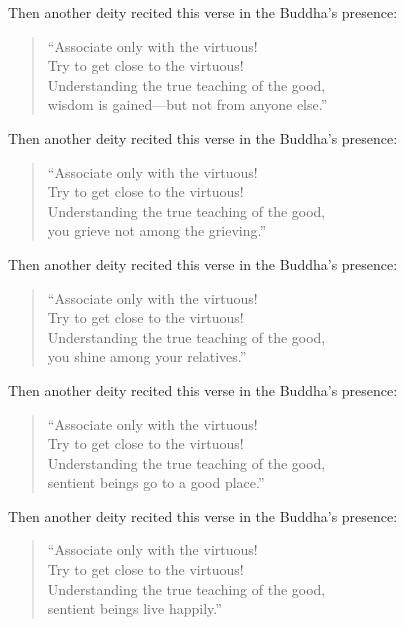 \documentclass[12pt,openany]{book}%
\begin{document}
Then another deity recited this verse in the Buddha’s presence: 

\begin{verse}%
“Associate only with the virtuous! \\
Try to get close to the virtuous! \\
Understanding the true teaching of the good, \\
wisdom is gained—but not from anyone else.” 

%
\end{verse}

Then another deity recited this verse in the Buddha’s presence: 

\begin{verse}%
“Associate only with the virtuous! \\
Try to get close to the virtuous! \\
Understanding the true teaching of the good, \\
you grieve not among the grieving.” 

%
\end{verse}

Then another deity recited this verse in the Buddha’s presence: 

\begin{verse}%
“Associate only with the virtuous! \\
Try to get close to the virtuous! \\
Understanding the true teaching of the good, \\
you shine among your relatives.” 

%
\end{verse}

Then another deity recited this verse in the Buddha’s presence: 

\begin{verse}%
“Associate only with the virtuous! \\
Try to get close to the virtuous! \\
Understanding the true teaching of the good, \\
sentient beings go to a good place.” 

%
\end{verse}

Then another deity recited this verse in the Buddha’s presence: 

\begin{verse}%
“Associate only with the virtuous! \\
Try to get close to the virtuous! \\
Understanding the true teaching of the good, \\
sentient beings live happily.” 

%
\end{verse}
\end{document}
